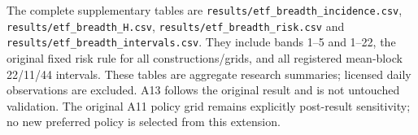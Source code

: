 The complete supplementary tables are \nolinkurl{results/etf_breadth_incidence.csv}, \nolinkurl{results/etf_breadth_H.csv}, \nolinkurl{results/etf_breadth_risk.csv} and \nolinkurl{results/etf_breadth_intervals.csv}. They include bands 1--5 and 1--22, the original fixed risk rule for all constructions/grids, and all registered mean-block 22/11/44 intervals. These tables are aggregate research summaries; licensed daily observations are excluded. A13 follows the original result and is not untouched validation. The original A11 policy grid remains explicitly post-result sensitivity; no new preferred policy is selected from this extension.
